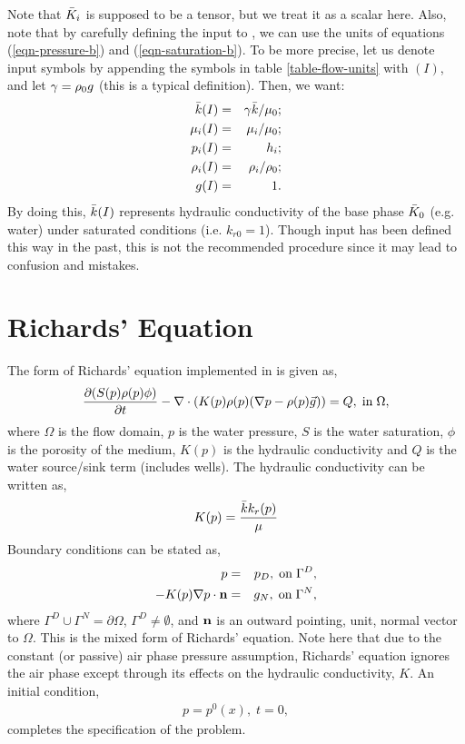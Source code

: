 Note that ${\bar K}_i$ is supposed to be a tensor, but we treat it as
a scalar here.
Also, note that by carefully defining the input to \parflow{}, we can
use the units of equations (\ref{eqn-pressure-b}) and
(\ref{eqn-saturation-b}).
To be more precise, let us denote \parflow{} input symbols by appending
the symbols in table \ref{table-flow-units} with $(I)$, and
let $\gamma = \rho_0 g$ (this is a typical definition).
Then, we want:
\begin{eqnarray} \label{eqn-parflow-input}
{\bar k} (I)    & = & \gamma {\bar k} / \mu_0 ; \\
\mu_i (I) & = & \mu_i / \mu_0 ; \\
p_i (I)   & = & h_i ; \\
\rho_i (I) & = & \rho_i / \rho_0 ; \\
g (I)      & = & 1 .
\end{eqnarray}
By doing this, ${\bar k} (I)$ represents hydraulic conductivity of the base
phase ${\bar K}_0$ (e.g. water) under saturated conditions (i.e. $k_{r0} = 1$).
Though \parflow{} input has been defined this way in the past, this is not
the recommended procedure since it may lead to confusion and mistakes.

\section{Richards' Equation}
\label{Richards' Equation}

The form of Richards' equation implemented in \parflow{} is given as,
\begin{eqnarray}
\frac{\partial (S(p)\rho(p)\phi)}{\partial t} 
- \nabla \cdot (K(p)\rho(p)(\nabla p - \rho(p) {\vec g})) = Q, \;  {\rm in} \; \Omega, 
\label{eq:richard}
\end{eqnarray}
where $\Omega$ is the flow domain, $p$ is the water pressure, $S$ is the water
saturation, $\phi$ is the porosity of the medium, $K(p)$ is the hydraulic
conductivity  and $Q$ is the water source/sink term (includes wells).
The hydraulic conductivity can be written as,
\begin{eqnarray}
K(p) =  \frac{{\bar k} k_r(p)}{\mu}
\end{eqnarray}
Boundary conditions can be stated as,
\begin{eqnarray}
p & = & p_D, \; {\rm on} \; \Gamma^D, \label{eq:bcd} \\
-K(p)\nabla p \cdot {\bf n} & = & 
g_N, \; {\rm on} \; \Gamma^N, \label{eq:bcn}
\end{eqnarray}
where $\Gamma^D \cup \Gamma^N = \partial \Omega$, $\Gamma^D \neq \emptyset$,
and ${\bf n}$ is an outward pointing, unit, normal vector to $\Omega$.
This is the mixed form of Richards' equation. 
Note here that due to the constant (or passive) air phase pressure assumption,
Richards' equation ignores the air phase except through its
effects on the hydraulic conductivity, $K$.  
An initial condition,
\begin{eqnarray}
p = p^0(x), \; t = 0,
\end{eqnarray}
completes the specification of the problem.
